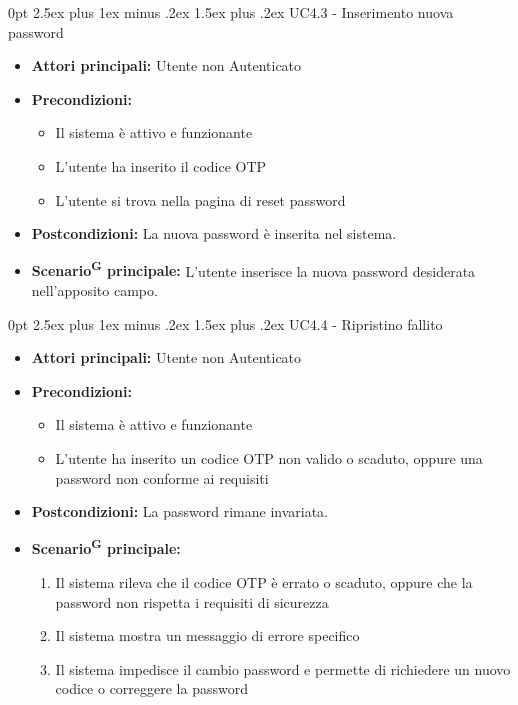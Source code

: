 \documentclass[a4paper, 11pt]{article}
\makeatletter
\renewcommand\paragraph{\@startsection{paragraph}{4}
  {0pt}
  {2.5ex plus 1ex minus .2ex}
  {1.5ex plus .2ex}
  {\normalfont\normalsize\bfseries\color{AccentDark}}}
\makeatother
\begin{document}
\paragraph{UC4.3 - Inserimento nuova password}\label{UC4.3}
\begin{itemize}
	\item \textbf{Attori principali:} Utente non Autenticato
	\item \textbf{Precondizioni:} 
	\begin{itemize}
		\item Il sistema è attivo e funzionante
		\item L'utente ha inserito il codice OTP
		\item L'utente si trova nella pagina di reset password
	\end{itemize}
	\item \textbf{Postcondizioni:} La nuova password è inserita nel sistema.
	\item \textbf{Scenario\textsuperscript{G} principale:} L'utente inserisce la nuova password desiderata nell'apposito campo.
\end{itemize}

\paragraph{UC4.4 - Ripristino fallito}\label{UC4.4}
\begin{itemize}
	\item \textbf{Attori principali:} Utente non Autenticato
	\item \textbf{Precondizioni:} 
	\begin{itemize}
		\item Il sistema è attivo e funzionante
		\item L'utente ha inserito un codice OTP non valido o scaduto, oppure una password non conforme ai requisiti
	\end{itemize}
	\item \textbf{Postcondizioni:} La password rimane invariata.
	\item \textbf{Scenario\textsuperscript{G} principale:}
	\begin{enumerate}
		\item Il sistema rileva che il codice OTP è errato o scaduto, oppure che la password non rispetta i requisiti di sicurezza
		\item Il sistema mostra un messaggio di errore specifico
		\item Il sistema impedisce il cambio password e permette di richiedere un nuovo codice o correggere la password
	\end{enumerate}
\end{itemize}
\end{document}
